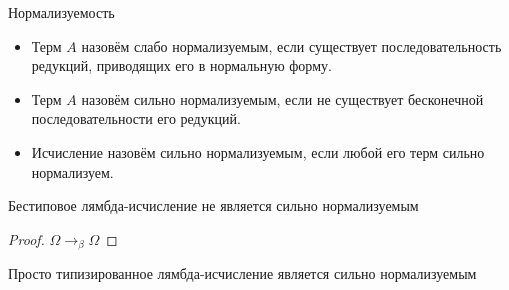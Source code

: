 \documentclass[aspectratio=169]{beamer}
\begin{document}
\begin{frame}{Нормализуемость}
\begin{dfn}
\begin{itemize}
\item Терм $A$ назовём слабо нормализуемым, если существует последовательность редукций,
приводящих его в нормальную форму.
\item Терм $A$ назовём сильно нормализуемым, если не существует бесконечной последовательности
его редукций.
\item Исчисление назовём сильно нормализуемым, если любой его терм сильно нормализуем.
\end{itemize}
\end{dfn}

\vspace{-0.3cm}
\begin{thm}Бестиповое лямбда-исчисление не является сильно нормализуемым\end{thm}
\vspace{-0.3cm}
\begin{proof}$\Omega \rightarrow_\beta \Omega$\end{proof}

\begin{thm}Просто типизированное лямбда-исчисление является сильно нормализуемым\end{thm}
\end{frame}
\end{document}
